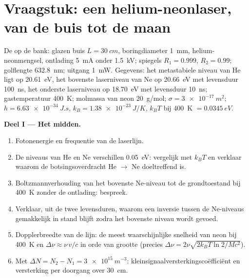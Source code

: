 \section{Vraagstuk: een helium-neonlaser, van de buis tot de maan}

\begin{problem}\label{pb:b2:laser:1}
De  op de bank: glazen buis $L = \qty{30}{cm}$, boringdiameter
\qty{1}{mm}, helium-neonmengsel, ontlading \qty{5}{mA} onder
\qty{1.5}{kV}; spiegels $R_1 = 0.999$, $R_2 = 0.99$; golflengte
\qty{632.8}{nm}; uitgang \qty{1}{mW}. Gegevens: het metastabiele niveau van He ligt
op \qty{20.61}{eV}, het bovenste laserniveau van Ne op \qty{20.66}{eV} met
levensduur \qty{100}{ns}, het onderste laserniveau op \qty{18.70}{eV} met
levensduur \qty{10}{ns}; gastemperatuur \qty{400}{K}; molmassa van neon
\qty{20}{g/mol};  $\sigma = \qty{3e-17}{m^2}$;
$h =
\qty{6.63e-34}{J.s}$, $k_B = \qty{1.38e-23}{J/K}$, $k_BT$ bij
\qty{400}{K}
$= \qty{0.0345}{eV}$.

\textbf{Deel I --- Het midden.}
\begin{enumerate}
  \item Fotonenergie en frequentie van de laserlijn.
  \item De niveaus van He en Ne verschillen \qty{0.05}{eV}: vergelijk met
        $k_BT$ en verklaar waarom de botsingsoverdracht He $\to$ Ne
        doeltreffend is.
  \item Boltzmannverhouding van het bovenste Ne-niveau tot de grondtoestand bij
        \qty{400}{K} zonder de ontlading: bespreek.
  \item Verklaar, uit de twee levensduren, waarom een inversie tussen de
        Ne-niveaus gemakkelijk in stand blijft zodra het bovenste niveau
        wordt gevoed.
  \item Dopplerbreedte van de lijn: de meest waarschijnlijke snelheid van neon bij
        \qty{400}{K} en $\Delta\nu \approx \nu\,v/c$ in orde van
        grootte (precies $\Delta\nu = 2\nu\sqrt{2k_BT\ln2/Mc^2}$).
  \item Met $\Delta N = N_2 - N_1 = \qty{3e15}{m^{-3}}$:
        kleinsignaal\-versterkingscoëfficiënt
        en versterking per doorgang over \qty{30}{cm}.
\end{enumerate}


\end{problem}
